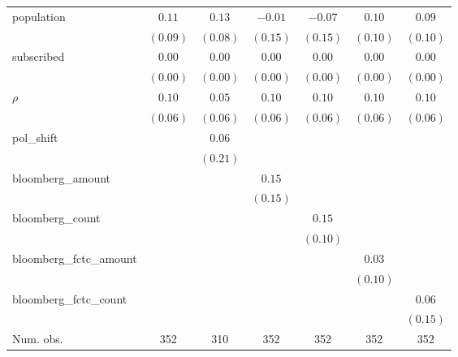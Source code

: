\begin{table}[!h]
\begin{center}
\begin{tabular}{l c c c c c c }
population              & $0.11$       & $0.13$       & $-0.01$      & $-0.07$      & $0.10$       & $0.09$       \\
                        & $(0.09)$     & $(0.08)$     & $(0.15)$     & $(0.15)$     & $(0.10)$     & $(0.10)$     \\
subscribed              & $0.00$       & $0.00$       & $0.00$       & $0.00$       & $0.00$       & $0.00$       \\
                        & $(0.00)$     & $(0.00)$     & $(0.00)$     & $(0.00)$     & $(0.00)$     & $(0.00)$     \\
$\rho$                  & $0.10$       & $0.05$       & $0.10$       & $0.10$       & $0.10$       & $0.10$       \\
                        & $(0.06)$     & $(0.06)$     & $(0.06)$     & $(0.06)$     & $(0.06)$     & $(0.06)$     \\
pol\_shift              &              & $0.06$       &              &              &              &              \\
                        &              & $(0.21)$     &              &              &              &              \\
bloomberg\_amount       &              &              & $0.15$       &              &              &              \\
                        &              &              & $(0.15)$     &              &              &              \\
bloomberg\_count        &              &              &              & $0.15$       &              &              \\
                        &              &              &              & $(0.10)$     &              &              \\
bloomberg\_fctc\_amount &              &              &              &              & $0.03$       &              \\
                        &              &              &              &              & $(0.10)$     &              \\
bloomberg\_fctc\_count  &              &              &              &              &              & $0.06$       \\
                        &              &              &              &              &              & $(0.15)$     \\
\midrule
Num. obs.               & 352          & 310          & 352          & 352          & 352          & 352          \\

\end{tabular}
\end{center}
\end{table}
